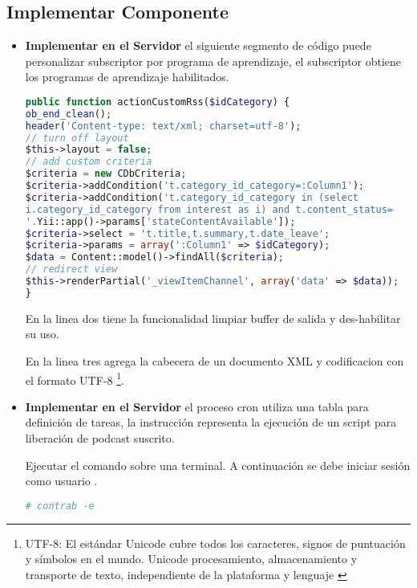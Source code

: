 \subsection{Implementar Componente}

\begin{itemize}

\item \textbf{Implementar en el Servidor} el siguiente segmento de código
puede personalizar subscriptor por programa de aprendizaje, el subscriptor
obtiene los programas de aprendizaje habilitados. 

\begin{lstlisting}[language = PHP, caption={Personalización de subscriptor.}]
public function actionCustomRss($idCategory) {
ob_end_clean();
header('Content-type: text/xml; charset=utf-8');
// turn off layout
$this->layout = false;
// add custom criteria
$criteria = new CDbCriteria;
$criteria->addCondition('t.category_id_category=:Column1');
$criteria->addCondition('t.category_id_category in (select 
i.category_id_category from interest as i) and t.content_status=
'.Yii::app()->params['stateContentAvailable']);
$criteria->select = 't.title,t.summary,t.date_leave';
$criteria->params = array(':Column1' => $idCategory);
$data = Content::model()->findAll($criteria);
// redirect view
$this->renderPartial('_viewItemChannel', array('data' => $data));
}
\end{lstlisting}

En la linea dos tiene la funcionalidad limpiar buffer de salida y
des-habilitar su uso.

En la linea tres agrega la cabecera de un documento XML y codificacion con
el formato UTF-8 \footnote{UTF-8: El estándar Unicode cubre todos
los caracteres, signos de puntuación y símbolos en el mundo. Unicode 
procesamiento, almacenamiento y transporte de texto, independiente de la 
plataforma y lenguaje \cite{utf8}}.

\item \textbf{Implementar en el Servidor} el proceso cron utiliza una tabla
para definición de tareas, la instrucción representa la ejecución de un
script para liberación de podcast suscrito.

Ejecutar el comando sobre una terminal. A continuación se debe iniciar sesión
como usuario .

\begin{lstlisting}[language=bash, caption={Acceso archivo crontab.}]
# contrab -e
\end{lstlisting}


\end{itemize}
